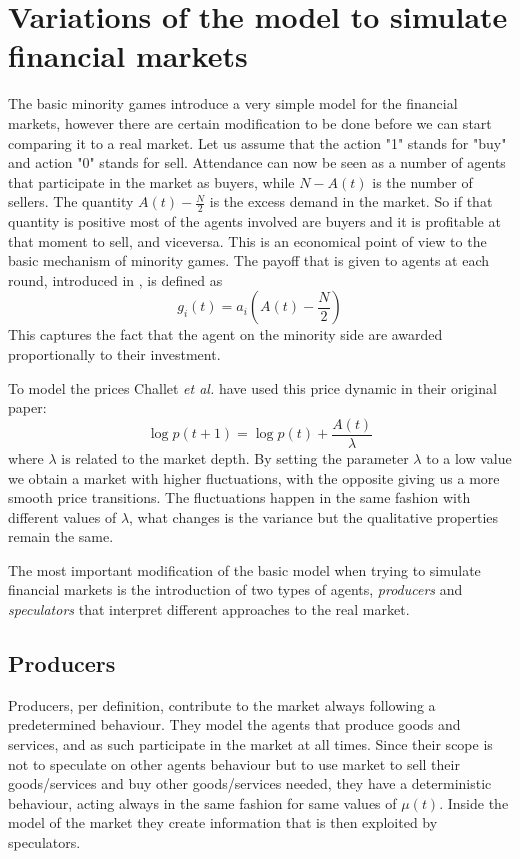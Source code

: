 \section{Variations of the model to simulate financial markets}
\label{minority:variations}

The basic minority games introduce a very simple model for the financial markets, however there are certain modification to be done before we can start comparing it to a real market.
Let us assume that the action "1" stands for "buy" and action "0" stands for sell.
Attendance can now be seen as a number of agents that participate in the market as buyers, while $N-A(t)$ is the number of sellers.
The quantity $A(t)-\frac{N}{2}$ is the excess demand in the market.
So if that quantity is positive most of the agents involved are buyers and it is profitable at that moment to sell, and viceversa.
This is an economical point of view to the basic mechanism of minority games.
The payoff that is given to agents at each round, introduced in \cite{challet2001stylized}, is defined as
\begin{displaymath}
g_i(t)=a_i(A(t) - \frac{N}{2})
\end{displaymath}
This captures the fact that the agent on the minority side are awarded proportionally to their investment.

To model the prices Challet \textit{et al.} have used this price dynamic in their original paper:
\begin{displaymath}
\log p(t+1) = \log p(t) + \frac{A(t)}{\lambda}
\end{displaymath}
where $\lambda$ is related to the market depth.
By setting the parameter $\lambda$ to a low value we obtain a market with higher fluctuations, with the opposite giving us a more smooth price transitions.
The fluctuations happen in the same fashion with different values of $\lambda$, what changes is the variance but the qualitative properties remain the same.

The most important modification of the basic model when trying to simulate financial markets is the introduction of two types of agents, \textit{producers} and \textit{speculators} that interpret different approaches to the real market.

\subsection{Producers}

Producers, per definition, contribute to the market always following a predetermined behaviour.
They model the agents that produce goods and services, and as such participate in the market at all times.
Since their scope is not to speculate on other agents behaviour but to use market to sell their goods/services and buy other goods/services needed, they have a deterministic behaviour, acting always in the same fashion for same values of $\mu(t)$.
Inside the model of the market they create information that is then exploited by speculators.

